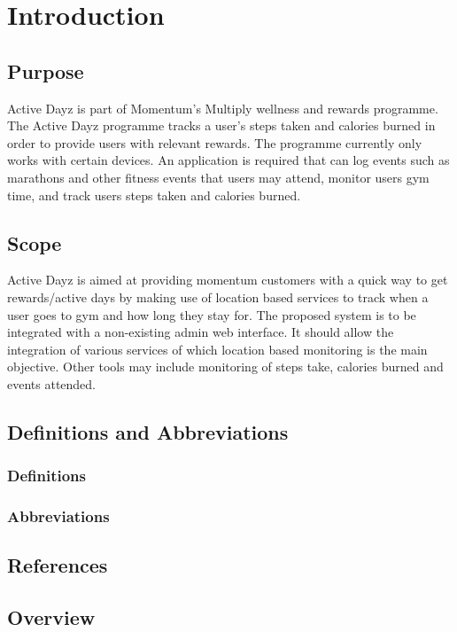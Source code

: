 \documentclass[11pt]{article}
\begin{document}
\newpage
\tableofcontents

\newpage

\section{Introduction}
\subsection{Purpose}
Active Dayz is part of Momentum's Multiply wellness and rewards programme. The Active Dayz programme tracks a user's steps taken and calories burned in order to provide users with relevant rewards. The programme currently only works with certain devices. An application is required that can log events such as marathons and other fitness events that users may attend, monitor users gym time, and track users steps taken and calories burned.

\subsection{Scope}
Active Dayz is aimed at providing momentum customers  with a quick way to get rewards/active days by making use of location based services to track when a user goes to gym and how long they stay for.
\newline
\newline
The proposed system is to be integrated with a non-existing admin web interface. It should allow the integration of various services of which location based monitoring is the main objective. Other tools may include monitoring of steps take, calories burned and events attended.

\subsection{Definitions and Abbreviations}
\subsubsection{Definitions}
\subsubsection{Abbreviations}

\subsection{References}
\subsection{Overview}
\end{document}
